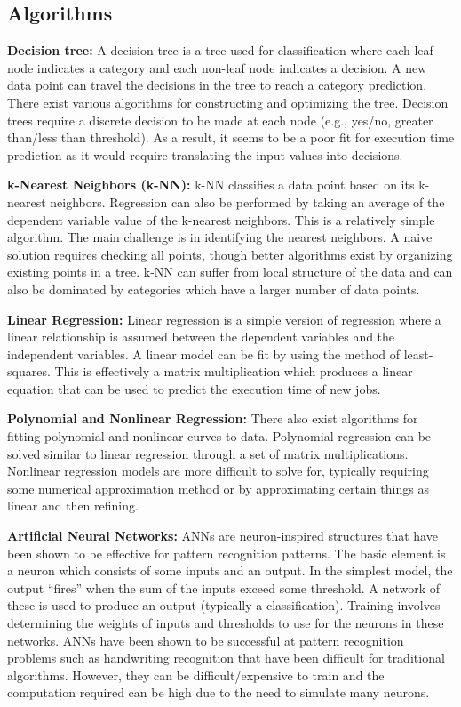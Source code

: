 \documentclass[11pt, letterpaper]{article}
\begin{document}
\subsection{Algorithms}
\label{sec:ml.algs}

\noindent\textbf{Decision tree: } A decision tree is a tree used for classification
where each leaf node indicates a category and each non-leaf node indicates a
decision. A new data point can travel the decisions in the tree to reach a
category prediction. There exist various algorithms for constructing and
optimizing the tree. Decision trees require a discrete decision to be made at
each node (e.g., yes/no, greater than/less than threshold). As a result, it
seems to be a poor fit for execution time prediction as it would require
translating the input values into decisions.

\noindent\textbf{k-Nearest Neighbors (k-NN): } k-NN classifies a data point based on its
k-nearest neighbors. Regression can also be performed by taking an average of
the dependent variable value of the k-nearest neighbors. This is a relatively
simple algorithm. The main challenge is in identifying the nearest neighbors. A
naive solution requires checking all points, though better algorithms exist by
organizing existing points in a tree. k-NN can suffer from local structure of
the data and can also be dominated by categories which have a larger number of
data points.

\noindent\textbf{Linear Regression: } Linear regression is a simple version of
regression where a linear relationship is assumed between the dependent
variables and the independent variables. A linear model can be fit by using the
method of least-squares. This is effectively a matrix multiplication which
produces a linear equation that can be used to predict the execution time of
new jobs.

\noindent\textbf{Polynomial and Nonlinear Regression: } There also exist algorithms for
fitting polynomial and nonlinear curves to data. Polynomial regression can be
solved similar to linear regression through a set of matrix multiplications.
Nonlinear regression models are more difficult to solve for, typically
requiring some numerical approximation method or by approximating certain
things as linear and then refining.

\noindent\textbf{Artificial Neural Networks: } ANNs are neuron-inspired structures that
have been shown to be effective for pattern recognition patterns. The basic
element is a neuron which consists of some inputs and an output. In the
simplest model, the output ``fires'' when the sum of the inputs exceed some
threshold. A network of these is used to produce an output (typically a
classification). Training involves determining the weights of inputs and
thresholds to use for the neurons in these networks. ANNs have been shown to be
successful at pattern recognition problems such as handwriting recognition that
have been difficult for traditional algorithms. However, they can be
difficult/expensive to train and the computation required can be high due to
the need to simulate many neurons.
\end{document}
